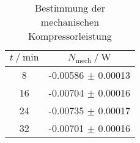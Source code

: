 \begin{table}
        \centering
        \label{tab:kompressorleistung}
        \begin{tabular}{c c}
        \toprule
        $t \mathbin{/} \si{\minute} $ & $N_\text{mech} \mathbin{/} \si{\watt}$  \\
        \midrule
        8  & -0.00586 $\pm$ 0.00013 \\
        16 & -0.00704 $\pm$ 0.00016 \\
        24 & -0.00735 $\pm$ 0.00017 \\
        32 & -0.00701 $\pm$ 0.00016 \\
        \bottomrule
        \end{tabular}
        \caption{Bestimmung der mechanischen Kompressorleistung}
        \end{table}